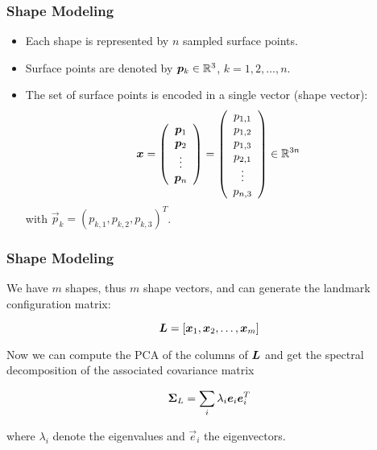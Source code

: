 	\begin{frame}
		\frametitle{Shape Modeling}

		\begin{itemize}
			\item Each shape is represented by $n$ sampled surface points.
			\item Surface points are denoted by ${\bm p}_k\in \mathbb{R}^3$, $k=1,2, \dots, n$.
			\item The set of surface points is encoded in a single vector (shape vector):
			      \begin{displaymath}
				      {\bm x} = \left(
				      \begin{array}{c}
						      {\bm p}_{1} \\
						      {\bm p}_{2} \\
						      \vdots     \\
						      {\bm p}_{n}
					      \end{array}
				      \right)
				      = \left(
				      \begin{array}{c}
						      p_{1,1} \\ p_{1,2} \\ p_{1,3} \\ p_{2,1}\\ \vdots \\ p_{n,3}
					      \end{array}
				      \right)
				      \in \mathbb{R}^{3n}
			      \end{displaymath}
			      with $\vec p_k=(p_{k,1}, p_{k,2},  p_{k,3})^T$.
		\end{itemize}
	\end{frame}


	\begin{frame}
		\frametitle{Shape Modeling \cont}

		We have $m$ shapes, thus $m$ shape vectors, and can generate the landmark configuration matrix:

		\begin{displaymath}
			{\bm L} =  [{\bm x}_1, {\bm x}_2, \dots, {\bm x}_m]
		\end{displaymath}
		\pause

		Now we can compute the PCA of the columns of ${\bm L}$ and get the spectral decomposition of the associated covariance matrix

		\begin{displaymath}
			{\bm \Sigma}_L = \sum_i \lambda_i {\bm e}_i {\bm e}_i^T
		\end{displaymath}

		where $\lambda_i$ denote the eigenvalues and $\vec e_i$ the eigenvectors.
	\end{frame}


